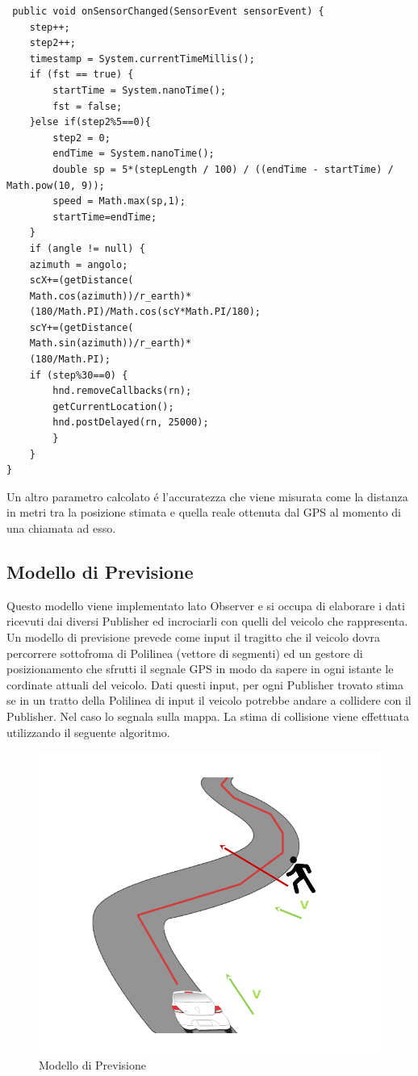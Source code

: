 \documentclass[conference]{IEEEtran}
\begin{document}
\begin{lstlisting}
 public void onSensorChanged(SensorEvent sensorEvent) {
    step++;
    step2++;
    timestamp = System.currentTimeMillis();
    if (fst == true) {
        startTime = System.nanoTime();
        fst = false;
    }else if(step2%5==0){
        step2 = 0;
        endTime = System.nanoTime();
        double sp = 5*(stepLength / 100) / ((endTime - startTime) / Math.pow(10, 9));
        speed = Math.max(sp,1);         
        startTime=endTime;
    }
    if (angle != null) {
    azimuth = angolo;
    scX+=(getDistance(
    Math.cos(azimuth))/r_earth)*
    (180/Math.PI)/Math.cos(scY*Math.PI/180);
    scY+=(getDistance(
    Math.sin(azimuth))/r_earth)*
    (180/Math.PI);
    if (step%30==0) {
        hnd.removeCallbacks(rn);
        getCurrentLocation();  
        hnd.postDelayed(rn, 25000);
        }
    }
}
\end{lstlisting}
Un altro parametro calcolato \'e l'accuratezza che viene misurata come la distanza in metri tra la posizione stimata e quella reale ottenuta dal GPS al momento di una chiamata ad esso.

\subsection{Modello di Previsione}
Questo modello viene implementato lato Observer e si occupa di elaborare i dati ricevuti dai diversi Publisher ed incrociarli con quelli del veicolo che rappresenta.
Un modello di previsione prevede come input il tragitto che il veicolo dovra percorrere sottofroma di Polilinea (vettore di segmenti) ed un gestore di posizionamento che sfrutti il segnale GPS in modo da sapere in ogni istante le cordinate attuali del veicolo.
Dati questi input, per ogni Publisher trovato stima se in un tratto della Polilinea di input il veicolo potrebbe andare a collidere con il Publisher. Nel caso lo segnala sulla mappa.
La stima di collisione viene effettuata utilizzando il seguente algoritmo.
 
 
\begin{figure}[h!]
	\centering
	\includegraphics[width=0.7\linewidth]{prevmod}
	\caption{Modello di Previsione}
	\label{fig:prevmod}
\end{figure}
 
\end{document}
